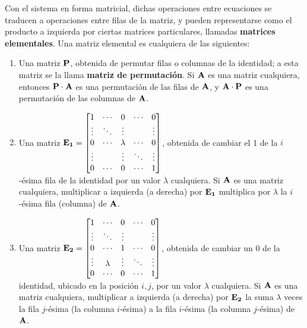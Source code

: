 Con el sistema en forma matricial, dichas operaciones entre ecuaciones se
traducen a operaciones entre filas de la matriz, y pueden representarse como
el producto a izquierda por ciertas matrices particulares, llamadas
\textbf{matrices elementales}. Una matriz elemental es cualquiera de las
siguientes:
\begin{enumerate}[label=(\arabic*)]
\item Una matriz $\mathbf{P}$, obtenida de permutar filas o columnas de la
    identidad; a esta matriz se la llama \textbf{matriz de permutación}.
    Si $\mathbf{A}$ es una matriz cualquiera, entonces $\mathbf{P}\cdot\mathbf{A}$ es
    una permutación de las filas de $\mathbf{A}$, y $\mathbf{A}\cdot\mathbf{P}$ es una
    permutación de las columnas de $\mathbf{A}$.
\item Una matriz $\mathbf{E_1} = \begin{bmatrix}
    1      & \cdots & 0       & \cdots & 0      \\
    \vdots & \ddots & \vdots  &        & \vdots \\
    0      & \cdots & \lambda & \cdots & 0      \\
    \vdots &        & \vdots  & \ddots & \vdots \\
    0      & \cdots & 0       & \cdots & 1      \\
\end{bmatrix}$, obtenida de cambiar el 1 de la $i$-ésima fila de la
identidad por un valor $\lambda$ cualquiera. Si $\mathbf{A}$ es una matriz
cualquiera, multiplicar a izquierda (a derecha) por $\mathbf{E_1}$ multiplica por
$\lambda$ la $i$-ésima fila (columna) de $\mathbf{A}$.
\item Una matriz $\mathbf{E_2} = \begin{bmatrix}
    1      & \cdots  & 0      & \cdots & 0      \\
    \vdots & \ddots  & \vdots &        & \vdots \\
    0      & \cdots  & 1      & \cdots & 0      \\
    \vdots & \lambda & \vdots & \ddots & \vdots \\
    0      & \cdots  & 0      & \cdots & 1      \\
\end{bmatrix}$, obtenida de cambiar un 0 de la identidad, ubicado
en la posición $i,j$, por un valor $\lambda$ cualquiera. Si $\mathbf{A}$ es una
matriz cualquiera, multiplicar a izquierda (a derecha) por $\mathbf{E_2}$
la suma $\lambda$ veces la fila $j$-ésima (la columna $i$-ésima) a la
fila $i$-ésima (la columna $j$-ésima) de $\mathbf{A}$.
\end{enumerate}

